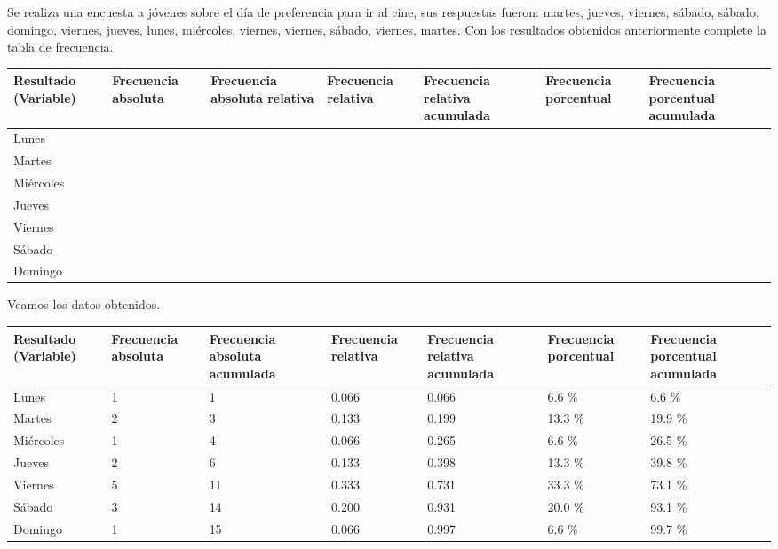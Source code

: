 \begin{exercise}
    Se realiza una encuesta a jóvenes sobre el día de preferencia para ir al cine, sus respuestas fueron:
    martes, jueves, viernes, sábado, sábado, domingo, viernes, jueves, lunes, miércoles, viernes, viernes, sábado, viernes, martes.
    Con los resultados obtenidos anteriormente complete la tabla de frecuencia.
    \begin{table}[H]
        \centering
        \begin{tabular}{|p{1.8cm}|p{1.8cm}|p{1.8cm}|p{1.8cm}|p{2cm}|p{2cm}|p{2cm}|}
            \hline
            Resultado (Variable) & Frecuencia absoluta & Frecuencia absoluta relativa & Frecuencia relativa & Frecuencia relativa acumulada & Frecuencia porcentual & Frecuencia porcentual acumulada\\
            \hline\hline
            Lunes & & & & & & \\\hline
            Martes & & & & & & \\\hline
            Miércoles & & & & & & \\\hline
            Jueves & & & & & & \\\hline
            Viernes & & & & & & \\\hline
            Sábado & & & & & & \\\hline
            Domingo & & & & & & \\\hline
        \end{tabular}
    \end{table}
\end{exercise}
\begin{solution}
    Veamos los datos obtenidos.
    \begin{table}[H]
        \centering
        \begin{tabular}{|p{1.8cm}|p{1.8cm}|p{2cm}|p{1.8cm}|p{2cm}|p{2cm}|p{2cm}|}
            \hline
            Resultado (Variable) & Frecuencia absoluta & Frecuencia absoluta acumulada & Frecuencia relativa & Frecuencia relativa acumulada & Frecuencia porcentual & Frecuencia porcentual acumulada\\
            \hline\hline
            Lunes     & 1 &  1 & 0.066 & 0.066 &  6.6 \% &  6.6 \% \\\hline
            Martes    & 2 &  3 & 0.133 & 0.199 & 13.3 \% & 19.9 \% \\\hline
            Miércoles & 1 &  4 & 0.066 & 0.265 &  6.6 \% & 26.5 \% \\\hline
            Jueves    & 2 &  6 & 0.133 & 0.398 & 13.3 \% & 39.8 \% \\\hline
            Viernes   & 5 & 11 & 0.333 & 0.731 & 33.3 \% & 73.1 \% \\\hline
            Sábado    & 3 & 14 & 0.200 & 0.931 & 20.0 \% & 93.1 \% \\\hline
            Domingo   & 1 & 15 & 0.066 & 0.997 &  6.6 \% & 99.7 \% \\\hline
        \end{tabular}
    \end{table}
\end{solution}

